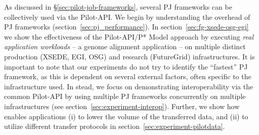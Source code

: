\documentclass[conference]{IEEEtran}
\begin{document}
As discussed in \S\ref{sec:pilot-job-frameworks}, several PJ
frameworks can be collectively used via the Pilot-API. We begin by
understanding the overhead of PJ frameworks
(section~\ref{sec:pj_performance}). In
section~\ref{sec:fg-xsede-osg-egi} we show the effectiveness of the
Pilot-API/P* Model approach by executing {\it real application
  workloads} -- a genome alignment application -- on multiple distinct
production (XSEDE, EGI, OSG) and research (FutureGrid)
infrastructures. It is important to note that our experiments do not
try to identify the ``fastest'' PJ framework, as this is dependent on
several external factors, often specific to the infrastructure
used. In stead, we focus on demonstrating interoperability via the
common Pilot-API by using multiple PJ frameworks concurrently on
multiple infrastructures (see section~\ref{sec:experiment-interop}).
Further, we show how \pilotdata enables applications (i) to lower
the volume of the transferred data, and (ii) to utilize different
transfer protocols in section~\ref{sec:experiment-pilotdata}.





\end{document}

